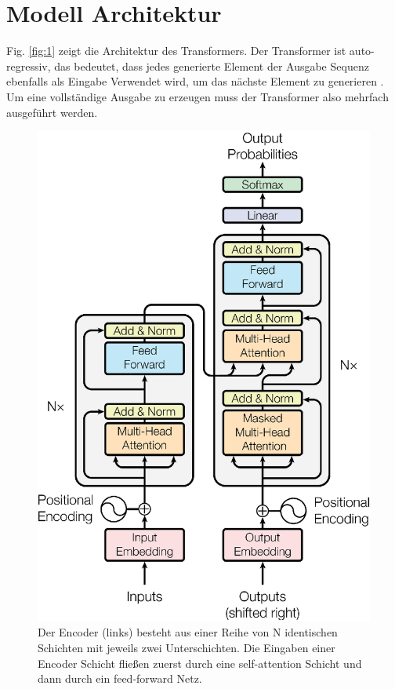 \documentclass[conference]{IEEEtran}
\begin{document}
\section{Modell Architektur}
Fig. \ref{fig:1} zeigt die Architektur des Transformers. Der Transformer ist auto-regressiv, das bedeutet, dass jedes generierte Element der Ausgabe Sequenz ebenfalls als Eingabe Verwendet wird, um das nächste Element zu generieren \cite{attention_is_all_you_need}. Um eine vollständige Ausgabe zu erzeugen muss der Transformer also mehrfach ausgeführt werden.
\begin{figure}[htbp]
\centerline{\includegraphics{img/figure1.png}}
\caption{Der Encoder (links) besteht aus einer Reihe von N identischen Schichten mit jeweils zwei Unterschichten. Die Eingaben einer Encoder Schicht fließen zuerst durch eine self-attention Schicht und dann durch ein feed-forward Netz. \\
}
\end{figure}
\end{document}

